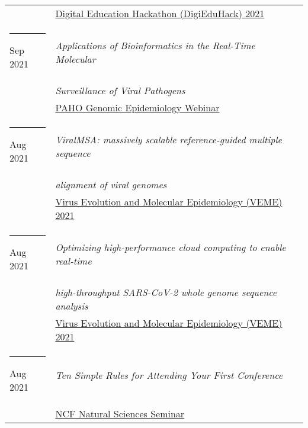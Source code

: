 \documentclass[margin,line]{res}
\begin{document}
\begin{resume}
\begin{longtable}{@{}p{0.7in}p{4in}}
\hspace*{-4mm} & \hspace{4mm} \href{https://digieduhack.com/}{Digital Education Hackathon (DigiEduHack) 2021}\\
\hspace*{-4mm} \rule{-1mm}{5mm} Sep 2021 & \textit{Applications of Bioinformatics in the Real-Time Molecular}\\*
\hspace*{-4mm} & \hspace{4mm} \textit{Surveillance of Viral Pathogens}\\*
\hspace*{-4mm} & \hspace{4mm} \href{https://www.paho.org/}{PAHO Genomic Epidemiology Webinar}\\
\hspace*{-4mm} \rule{-1mm}{5mm} Aug 2021 & \textit{ViralMSA: massively scalable reference-guided multiple sequence}\\*
\hspace*{-4mm} & \hspace{4mm} \textit{alignment of viral genomes}\\*
\hspace*{-4mm} & \hspace{4mm} \href{https://rega.kuleuven.be/cev/veme-workshop/2021}{Virus Evolution and Molecular Epidemiology (VEME) 2021}\\
\hspace*{-4mm} \rule{-1mm}{5mm} Aug 2021 & \textit{Optimizing high-performance cloud computing to enable real-time}\\*
\hspace*{-4mm} & \hspace{4mm} \textit{high-throughput SARS-CoV-2 whole genome sequence analysis}\\*
\hspace*{-4mm} & \hspace{4mm} \href{https://rega.kuleuven.be/cev/veme-workshop/2021}{Virus Evolution and Molecular Epidemiology (VEME) 2021}\\
\hspace*{-4mm} \rule{-1mm}{5mm} Aug 2021 & \textit{Ten Simple Rules for Attending Your First Conference}\\*
\hspace*{-4mm} & \hspace{4mm} \href{https://www.ncf.edu/academics/undergraduate-program/division-of-natural-sciences/natural-sciences/}{NCF Natural Sciences Seminar}\\

\end{longtable}
\end{resume}
\end{document}
